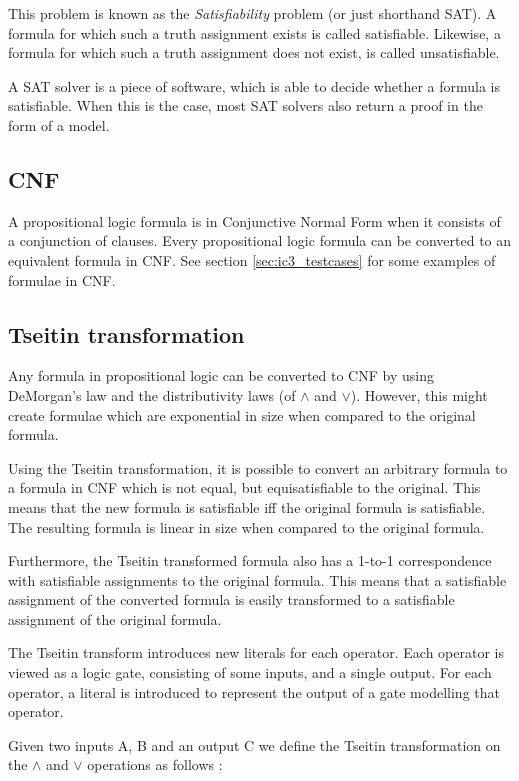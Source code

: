 \documentclass[a4paper]{article}
\begin{document}
This problem is known as the \emph{Satisfiability} problem (or just shorthand SAT). A formula for which such a truth assignment exists is called satisfiable. Likewise, a formula for which such a truth assignment does not exist, is called unsatisfiable.

A SAT solver is a piece of software, which is able to decide whether a formula is satisfiable. When this is the case, most SAT solvers also return a proof in the form of a model.

\subsection{CNF}
A propositional logic formula is in Conjunctive Normal Form when it consists of a conjunction of clauses. Every propositional logic formula can be converted to an equivalent formula in CNF. See section \ref{sec:ic3_testcases} for some examples of formulae in CNF.

\subsection{Tseitin transformation}
Any formula in propositional logic can be converted to CNF by using DeMorgan's law and the distributivity laws (of $\land$ and $\lor$). However, this might create formulae which are exponential in size when compared to the original formula.

Using the Tseitin transformation, it is possible to convert an arbitrary formula to a formula in CNF which is not equal, but equisatisfiable to the original. This means that the new formula is satisfiable iff the original formula is satisfiable. The resulting formula is linear in size when compared to the original formula.

Furthermore, the Tseitin transformed formula also has a 1-to-1 correspondence with satisfiable assignments to the original formula. This means that a satisfiable assignment of the converted formula is easily transformed to a satisfiable assignment of the original formula.

The Tseitin transform introduces new literals for each operator. Each operator is viewed as a logic gate, consisting of some inputs, and a single output. For each operator, a literal is introduced to represent the output of a gate modelling that operator.

Given two inputs A, B and an output C we define the Tseitin transformation on the $\land$ and $\lor$ operations as follows \cite{Wikipedia2015}:
\end{document}
